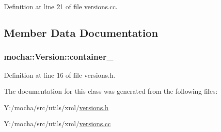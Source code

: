 Definition at line 21 of file versions.cc.



\subsection{Member Data Documentation}
\hypertarget{classmocha_1_1_version_a7b1ea5b68dd5f6296d22a7c40ec3bac3}{
\subsubsection[{container\_\-}]{ {\bf mocha::Version::container\_\-}}}
\label{classmocha_1_1_version_a7b1ea5b68dd5f6296d22a7c40ec3bac3}


Definition at line 16 of file versions.h.



The documentation for this class was generated from the following files:\begin{DoxyCompactItemize}
\item 
Y:/mocha/src/utils/xml/\hyperlink{versions_8h}{versions.h}\item 
Y:/mocha/src/utils/xml/\hyperlink{versions_8cc}{versions.cc}\end{DoxyCompactItemize}
